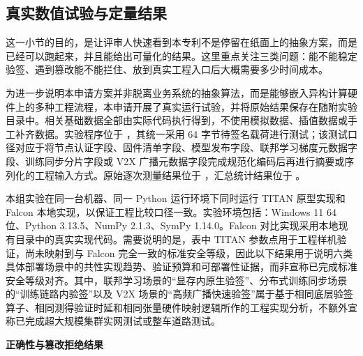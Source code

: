 \documentclass[12pt,a4paper]{article}
\begin{document}
\subsection{真实数值试验与定量结果}

这一小节的目的，是让评审人快速看到本专利不是停留在纸面上的抽象方案，而是已经可以跑起来，并且能给出可量化的结果。这里重点关注三类问题：能不能稳定验签、遇到篡改能不能拦住、放到真实工程入口后大概需要多少时间成本。

为进一步说明本申请方案并非脱离业务系统的抽象算法，而是能够嵌入异构计算硬件上的多种工程流程，本申请开展了真实运行试验，并将原始结果保存在随附实验目录中。相关基础数据全部由实际代码执行得到，不使用模拟数据、插值数据或手工补齐数据。实验程序位于 ，其统一采用 64 字节待签名载荷进行测试；该测试口径对应于将节点认证字段、固件清单字段、模型发布字段、联邦学习梯度元数据字段、训练同步分片字段或 V2X 广播元数据字段完成规范化编码后再进行摘要或序列化的工程输入方式。原始逐次测量结果位于 ，汇总统计结果位于 。

本组实验在同一台机器、同一 Python 运行环境下同时运行 TITAN 原型实现和 Falcon 本地实现，以保证工程比较口径一致。实验环境包括：Windows 11 64 位、Python 3.13.5、NumPy 2.1.3、SymPy 1.14.0。Falcon 对比实现采用本地现有目录中的真实实现代码。需要说明的是，表中 TITAN 参数点用于工程样机验证，尚未映射到与 Falcon 完全一致的标准安全等级，因此以下结果用于说明六类具体部署场景中的共性实现趋势、验证预算和可部署性证据，而非宣称已完成标准安全等级对齐。其中，联邦学习场景的“显存内原生验签”、分布式训练同步场景的“训练链路内验签”以及 V2X 场景的“高频广播快速验签”属于基于相同底层验签算子、相同测得验证时延和相同张量硬件映射逻辑所作的工程实现分析，不额外宣称已完成超大规模集群实网测试或整车道路测试。

\textbf{正确性与篡改拒绝结果}

\begin{table}[htbp]
    \centering
    \small
    \caption{真实运行下的正确性与篡改拒绝结果}
\end{table}
\end{document}
